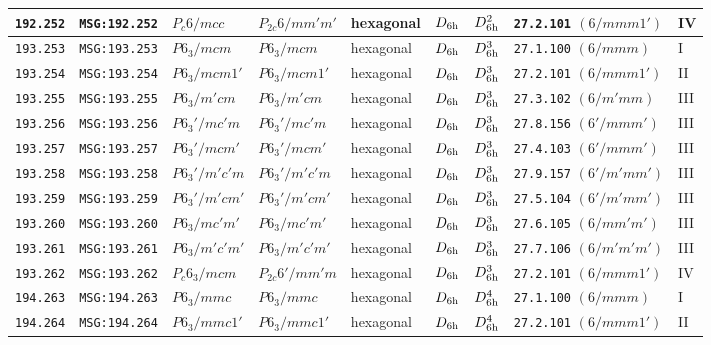 \documentclass[fleqn,10pt]{jsarticle}
\begin{document}
\begin{center}
\begin{longtable}{lllllllll}
\texttt{192.252} & \texttt{MSG:192.252} & $P_{c}6/mcc$ & $P_{2c}6/mm'm'$ & hexagonal & $D_{\rm 6h}$ & $D_{\rm 6h}^{2}$ & \texttt{27.2.101} $(6/mmm1')$ & IV \\ \hline
\texttt{193.253} & \texttt{MSG:193.253} & $P6_{3}/mcm$ & $P6_{3}/mcm$ & hexagonal & $D_{\rm 6h}$ & $D_{\rm 6h}^{3}$ & \texttt{27.1.100} $(6/mmm)$ & I \\
\texttt{193.254} & \texttt{MSG:193.254} & $P6_{3}/mcm1'$ & $P6_{3}/mcm1'$ & hexagonal & $D_{\rm 6h}$ & $D_{\rm 6h}^{3}$ & \texttt{27.2.101} $(6/mmm1')$ & II \\
\texttt{193.255} & \texttt{MSG:193.255} & $P6_{3}/m'cm$ & $P6_{3}/m'cm$ & hexagonal & $D_{\rm 6h}$ & $D_{\rm 6h}^{3}$ & \texttt{27.3.102} $(6/m'mm)$ & III \\
\texttt{193.256} & \texttt{MSG:193.256} & $P6_{3}'/mc'm$ & $P6_{3}'/mc'm$ & hexagonal & $D_{\rm 6h}$ & $D_{\rm 6h}^{3}$ & \texttt{27.8.156} $(6'/mmm')$ & III \\
\texttt{193.257} & \texttt{MSG:193.257} & $P6_{3}'/mcm'$ & $P6_{3}'/mcm'$ & hexagonal & $D_{\rm 6h}$ & $D_{\rm 6h}^{3}$ & \texttt{27.4.103} $(6'/mmm')$ & III \\
\texttt{193.258} & \texttt{MSG:193.258} & $P6_{3}'/m'c'm$ & $P6_{3}'/m'c'm$ & hexagonal & $D_{\rm 6h}$ & $D_{\rm 6h}^{3}$ & \texttt{27.9.157} $(6'/m'mm')$ & III \\
\texttt{193.259} & \texttt{MSG:193.259} & $P6_{3}'/m'cm'$ & $P6_{3}'/m'cm'$ & hexagonal & $D_{\rm 6h}$ & $D_{\rm 6h}^{3}$ & \texttt{27.5.104} $(6'/m'mm')$ & III \\
\texttt{193.260} & \texttt{MSG:193.260} & $P6_{3}/mc'm'$ & $P6_{3}/mc'm'$ & hexagonal & $D_{\rm 6h}$ & $D_{\rm 6h}^{3}$ & \texttt{27.6.105} $(6/mm'm')$ & III \\
\texttt{193.261} & \texttt{MSG:193.261} & $P6_{3}/m'c'm'$ & $P6_{3}/m'c'm'$ & hexagonal & $D_{\rm 6h}$ & $D_{\rm 6h}^{3}$ & \texttt{27.7.106} $(6/m'm'm')$ & III \\
\texttt{193.262} & \texttt{MSG:193.262} & $P_{c}6_{3}/mcm$ & $P_{2c}6'/mm'm$ & hexagonal & $D_{\rm 6h}$ & $D_{\rm 6h}^{3}$ & \texttt{27.2.101} $(6/mmm1')$ & IV \\ \hline
\texttt{194.263} & \texttt{MSG:194.263} & $P6_{3}/mmc$ & $P6_{3}/mmc$ & hexagonal & $D_{\rm 6h}$ & $D_{\rm 6h}^{4}$ & \texttt{27.1.100} $(6/mmm)$ & I \\
\texttt{194.264} & \texttt{MSG:194.264} & $P6_{3}/mmc1'$ & $P6_{3}/mmc1'$ & hexagonal & $D_{\rm 6h}$ & $D_{\rm 6h}^{4}$ & \texttt{27.2.101} $(6/mmm1')$ & II \\

\end{longtable}
\end{center}
\end{document}

